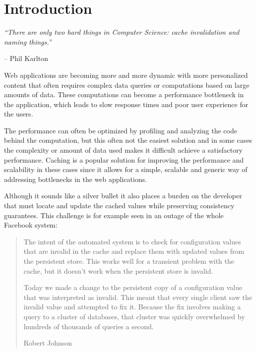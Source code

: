 \chapter{Introduction}

\emph{``There are only two hard things in Computer Science: cache invalidation and naming things.''} \vspace{-1cm}
\begin{flushright}-- Phil Karlton\end{flushright}

Web applications are becoming more and more dynamic with more personalized content that often requires complex data queries or computations based on large amounts of data. These computations can become a performance bottleneck in the application, which leads to slow response times and poor user experience for the users.

The performance can often be optimized by profiling and analyzing the code behind the computation, but this often not the easiest solution and in some cases the complexity or amount of data used makes it difficult achieve a satisfactory performance. Caching is a popular solution for improving the performance and scalability in these cases since it allows for a simple, scalable and generic way of addressing bottlenecks in the web applications.

Although it sounds like a silver bullet it also places a burden on the developer that must locate and update the cached values while preserving consistency guarantees. This challenge is for example seen in an outage of the whole Facebook system:

\begin{quote}
  The intent of the automated system is to check for configuration values that are invalid in the cache and replace them with updated values from the persistent store. This works well for a transient problem with the cache, but it doesn’t work when the persistent store is invalid.

 Today we made a change to the persistent copy of a configuration value that was interpreted as invalid. This meant that every single client saw the invalid value and attempted to fix it. Because the fix involves making a query to a cluster of databases, that cluster was quickly overwhelmed by hundreds of thousands of queries a second.
\begin{flushright}Robert Johnson~\cite{facebook_outage}\end{flushright}
\end{quote}

